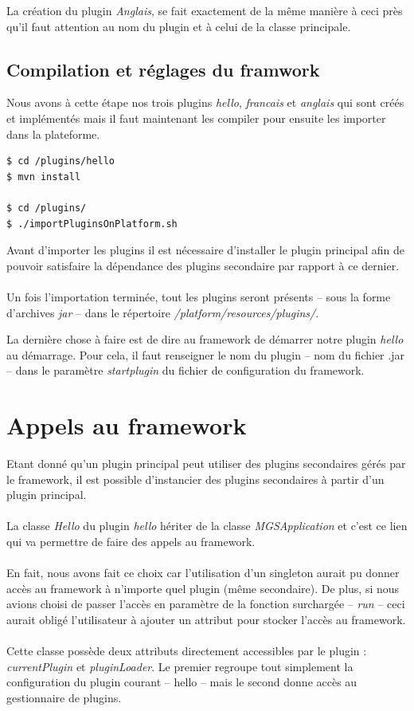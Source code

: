\documentclass[12pt,a4paper]{article}
\begin{document}
La création du plugin \emph{Anglais}, se fait exactement de la même manière à ceci 
près qu'il faut attention au nom du plugin et à celui de la classe principale.

\subsection{Compilation et réglages du framwork}
Nous avons à cette étape nos trois plugins \emph{hello}, \emph{francais} et 
\emph{anglais} qui sont créés et implémentés mais il faut maintenant les compiler 
pour ensuite les importer dans la plateforme.

\begin{lstlisting}[language=bash,caption=Compilation des plugins]
$ cd /plugins/hello
$ mvn install

$ cd /plugins/
$ ./importPluginsOnPlatform.sh
\end{lstlisting}

Avant d'importer les plugins il est nécessaire d'installer le plugin principal 
afin de pouvoir satisfaire la dépendance des plugins secondaire par rapport 
à ce dernier.
\\\\
Un fois l'importation terminée, tout les plugins seront présents -- sous la forme 
d'archives \emph{jar} -- dans le répertoire \emph{/platform/resources/plugins/}.

La dernière chose à faire est de dire au framework de démarrer notre plugin 
\emph{hello} au démarrage. Pour cela, il faut renseigner le nom du plugin 
-- nom du fichier .jar -- dans le paramètre \emph{startplugin} du fichier de 
configuration du framework.

\section{Appels au framework}
Etant donné qu'un plugin principal peut utiliser des plugins secondaires gérés 
par le framework, il est possible d'instancier des plugins secondaires à 
partir d'un plugin principal.
\\\\
La classe \emph{Hello} du plugin \emph{hello} hériter de la classe 
\emph{MGSApplication} et c'est ce lien qui va permettre de faire des appels au 
framework. 
\\\\
En fait, nous avons fait ce choix car l'utilisation d'un singleton aurait pu 
donner accès au framework à n'importe quel plugin (même secondaire). De plus, si 
nous avions choisi de passer l'accès en paramètre de la fonction surchargée -- 
\emph{run} -- ceci aurait obligé l'utilisateur à ajouter un attribut pour stocker 
l'accès au framework.
\\\\
Cette classe possède deux attributs directement accessibles par le plugin :
\emph{currentPlugin} et \emph{pluginLoader}. Le premier regroupe tout simplement 
la configuration du plugin courant -- hello -- mais le second donne accès au 
gestionnaire de plugins.
\end{document}
